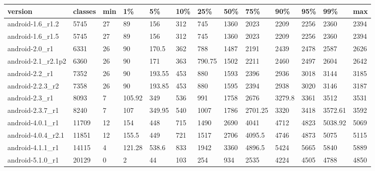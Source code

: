 \begin{tabular}{|l|l|l|l|l|l|l|l|l|l|l|l|l|}
\hline
version&classes&min&1\%&5\%&10\%&25\%&50\%&75\%&90\%&95\%&99\%&max\\
\hline
android-1.6\_r1.2&5745&27&89&156&312&745&1360&2023&2209&2256&2360&2394\\
\hline
android-1.6\_r1.5&5745&27&89&156&312&745&1360&2023&2209&2256&2360&2394\\
\hline
android-2.0\_r1&6331&26&90&170.5&362&788&1487&2191&2439&2478&2587&2626\\
\hline
android-2.1\_r2.1p2&6360&26&90&171&363&790.75&1502&2211&2460&2497&2604&2642\\
\hline
android-2.2\_r1&7352&26&90&193.55&453&880&1593&2396&2936&3018&3144&3185\\
\hline
android-2.2.3\_r2&7358&26&90&193.85&453&880&1595&2394&2938&3020&3146&3187\\
\hline
android-2.3\_r1&8093&7&105.92&349&536&991&1758&2676&3279.8&3361&3512&3531\\
\hline
android-2.3.7\_r1&8240&7&107&349.95&540&1007&1786&2701.25&3320&3418&3572.61&3592\\
\hline
android-4.0.1\_r1&11709&12&154&448&715&1490&2690&4041&4712&4823&5038.92&5069\\
\hline
android-4.0.4\_r2.1&11851&12&155.5&449&721&1517&2706&4095.5&4746&4873&5075&5115\\
\hline
android-4.1.1\_r1&14115&4&121.28&538.6&833&1942&3360&4896.5&5424&5665&5840&5889\\
\hline
android-5.1.0\_r1&20129&0&2&44&103&254&934&2535&4224&4505&4788&4850\\
\hline
\end{tabular}
